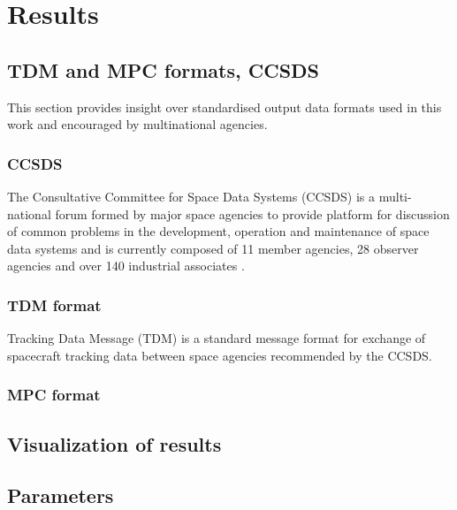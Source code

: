\chapter{Results}\label{chap:results}

\section{TDM and MPC formats, CCSDS}\label{sec:tdm_ccsds}

	This section provides insight over standardised output data formats used in this work and encouraged by multinational agencies. 

\subsection{CCSDS}\label{subsec:ccsds}
	The Consultative Committee for Space Data Systems (CCSDS) is a multi-national forum formed by major space agencies to provide platform for discussion of common problems in the development, operation and maintenance of space data systems and is currently composed of 11 member agencies, 28 observer agencies and over 140 industrial associates \citep{ccsds}.

\subsection{TDM format}

		Tracking Data Message (TDM) is a standard message format for exchange of spacecraft tracking data between space agencies recommended by the CCSDS.
		
		\citep{TDMdefinition}
		
\subsection{MPC format}

	\citep{mpc}

\section{Visualization of results}\label{sec:visualization}

\section{Parameters}\label{sec:parameters}